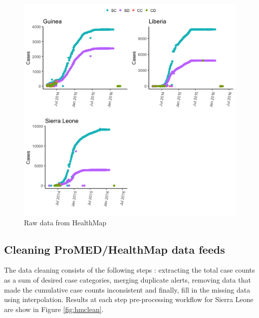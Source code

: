 \documentclass[]{article}
\begin{document}
\begin{figure}

{\centering \includegraphics[width=6.67in]{figures/hmraw} 

}

\caption{Raw data from HealthMap}\label{fig:hmraw}
\end{figure}

\subsection{Cleaning ProMED/HealthMap data
feeds}\label{cleaning-promedhealthmap-data-feeds}

The data cleaning consists of the following steps : extracting the total
case counts as a sum of desired case categories, merging duplicate
alerts, removing data that made the cumulative case counts inconsistent
and finally, fill in the missing data using interpolation. Results at
each step pre-processing workflow for Sierra Leone are show in Figure
\ref{fig:hmclean}.
\end{document}
